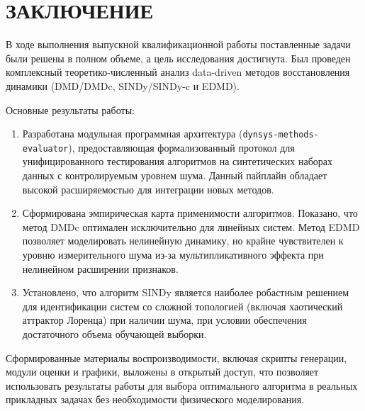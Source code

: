 \chapter*{ЗАКЛЮЧЕНИЕ}
\label{ch:conclusion}

В ходе выполнения выпускной квалификационной работы поставленные задачи были решены в полном объеме, а цель исследования достигнута. Был проведен комплексный теоретико-численный анализ data-driven методов восстановления динамики (DMD/DMDc, SINDy/SINDy-c и EDMD).

Основные результаты работы:
\begin{enumerate}
    \item Разработана модульная программная архитектура (\texttt{dynsys-methods-evaluator}), предоставляющая формализованный протокол для унифицированного тестирования алгоритмов на синтетических наборах данных с контролируемым уровнем шума. Данный пайплайн обладает высокой расширяемостью для интеграции новых методов.
    \item Сформирована эмпирическая карта применимости алгоритмов. Показано, что метод DMDc оптимален исключительно для линейных систем. Метод EDMD позволяет моделировать нелинейную динамику, но крайне чувствителен к уровню измерительного шума из-за мультипликативного эффекта при нелинейном расширении признаков. 
    \item Установлено, что алгоритм SINDy является наиболее робастным решением для идентификации систем со сложной топологией (включая хаотический аттрактор Лоренца) при наличии шума, при условии обеспечения достаточного объема обучающей выборки.
\end{enumerate}

Сформированные материалы воспроизводимости, включая скрипты генерации, модули оценки и графики, выложены в открытый доступ, что позволяет использовать результаты работы для выбора оптимального алгоритма в реальных прикладных задачах без необходимости физического моделирования.
